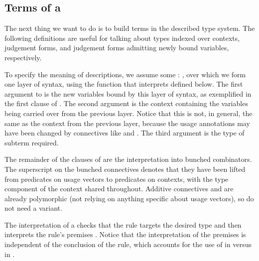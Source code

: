 \subsection{Terms of a }\label{sec:terms}

The next thing we want to do is to build terms in the described type system.
The following definitions are useful for talking about types indexed over
contexts, judgement forms, and judgement forms admitting newly bound variables,
respectively.


To specify the meaning of descriptions, we assume some  : ,
over which we form one layer of syntax, using the function
 that interprets
 defined below.  The first argument to
 is the new variables bound by this layer of syntax, as
exemplified in the first clause of
.  The second argument is
the context containing the variables being carried over from the
previous layer.  Notice that this is not, in general, the same as the
context from the previous layer, because the usage annotations may
have been changed by connectives like
 and
.  The third argument is the
type of subterm required.

The remainder of the clauses of 
are the interpretation into bunched combinators.
The superscript  on the bunched connectives denotes that
they have been lifted from predicates on usage vectors to predicates on
contexts, with the type component of the context shared throughout.
Additive connectives  and \AgdaFunction{$\dottimes$} are
already polymorphic (not relying on anything specific about usage vectors), so
do not need a  variant.


The interpretation of a  checks that the rule targets
the desired type and then interprets the rule's premises
.  Notice that the interpretation of the premises is
independent of the conclusion of the rule, which accounts for the use
of  in
 versus
 in .

